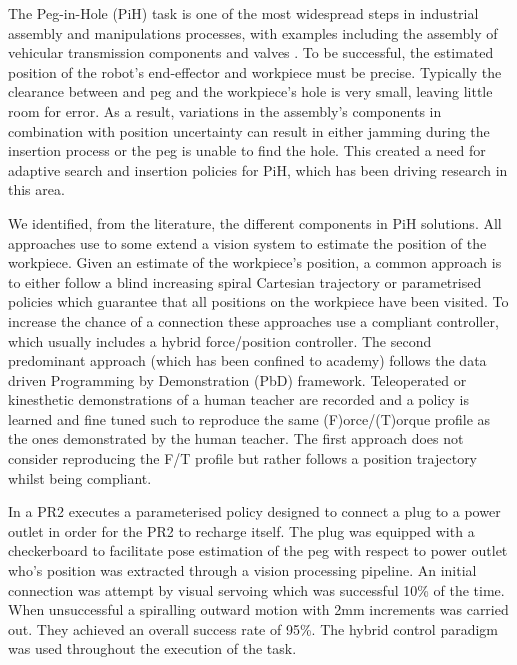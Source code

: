 \documentclass[final,3p,times,twocolumn]{elsarticle}
\begin{document}
The Peg-in-Hole (PiH) task is one of the most widespread steps in industrial assembly and manipulations processes, with 
examples including the assembly of vehicular transmission components \cite{search_strategies_icra_2001} and 
valves \cite{online_gpr_icra_2014}. To be successful, the estimated
position of the robot's end-effector and workpiece must be precise. Typically the clearance between and peg and the workpiece's hole is very small, leaving 
little room for error. As a result, variations in the assembly's components in combination with position uncertainty 
can result in either jamming during the insertion process or the peg is unable to find the hole. This 
created a need for adaptive search and insertion policies for PiH, which has been driving research 
in this area. 

We identified, from the literature, the different components in PiH solutions. All approaches
use to some extend a vision system to estimate the position of the workpiece. Given an estimate of the workpiece's position, 
a common approach is to either follow a blind increasing spiral Cartesian trajectory or parametrised policies 
which guarantee that all positions on the workpiece have been visited. To 
increase the chance of a connection these approaches use a compliant controller, 
which usually includes a hybrid force/position controller.
The second predominant approach (which has been confined to academy) follows the data driven Programming by Demonstration (PbD) 
framework. Teleoperated or kinesthetic demonstrations of a human teacher are recorded and a policy is learned and fine tuned 
such to reproduce the same (F)orce/(T)orque profile as the ones demonstrated by the human teacher. The first approach 
does not consider reproducing the F/T profile but rather follows a position trajectory whilst being compliant.

In \cite{peg_personal_icra_2010} a PR2 executes a parameterised policy designed to connect a plug to a power outlet
in order for the PR2 to recharge itself. The plug was equipped with a checkerboard to facilitate pose estimation
of the peg with respect to power outlet who's position was extracted through a vision processing pipeline.
An initial connection was attempt by visual servoing which was successful 10\% of the time. When unsuccessful 
a spiralling outward motion with 2mm increments was carried out. They achieved an overall success rate of 95\%.
The hybrid control paradigm \cite{hybrid_1992} was used throughout the execution of the task.
\end{document}
